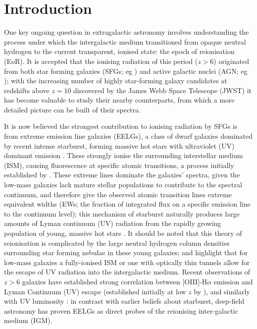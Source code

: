\documentclass[fleqn,usenatbib]{mnras}
\begin{document}
\section{Introduction}
One key ongoing question in extragalactic astronomy involves understanding the process under which the intergalactic medium transitioned from opaque neutral hydrogen to the current transparent, ionised state: the epoch of reionisation (EoR). It is accepted \citep{brunker_2020} that the ionising  radiation of this period ($z>6$) originated from both star forming galaxies (SFGs; eg \cite{robertson2020,tacchella_2025}) and active galactic nuclei (AGN; eg \cite{2004ApJ...604..484M, Madau2014}); with the increasing number of highly star-forming galaxy candidates at redshifts above $z=10$ discovered by the James Webb Space Telescope (JWST) \citep{Rhoads, hainline_2023} it has become valuable to study their nearby counterparts, from which a more detailed picture can be built of their spectra. 

It is now believed the strongest contribution to ionising radiation by SFGs is from extreme emission line galaxies (EELGs), a class of dwarf galaxies dominated by recent intense starburst, forming massive hot stars with ultraviolet (UV) dominant emission \citep{tang2023, davis2024}. These strongly ionise the surrounding interstellar medium (ISM), causing fluorescence at specific atomic transitions, a process initially established by \cite{menzel}. These extreme lines dominate the galaxies’ spectra, given the low-mass galaxies lack mature stellar populations to contribute to the spectral continuum, and therefore give the observed atomic transition lines extreme equivalent widths (EWs; the fraction of integrated flux on a specific emission line to the continuum level); this mechanism of starburst naturally produces large amounts of Lyman continuum (UV) radiation from the rapidly growing population of young, massive hot stars \citep{madau1999, gigure2008}. It should be noted that this theory of reionisation is complicated by the large neutral hydrogen column densities surrounding star forming nebulae in these young galaxies; \cite{jaskotoey} and \cite{izotov_2018} highlight that for low-mass galaxies a fully-ionised ISM or one with optically thin tunnels allow for the escape of UV radiation into the intergalactic medium. Recent observations of $z>6$ galaxies have established strong correlation between [OIII]-H$\alpha$ emission  and Lyman Continuum (UV) escape \citep{tang2023} (established initially at low $z$ by \cite{flury2022}), and similarly with UV luminosity \citep{endsley2024}: in contrast with earlier \citep{hackman1995} beliefs about starburst, deep-field astronomy has proven EELGs as direct probes of the reionising inter-galactic medium (IGM). 
\end{document}
